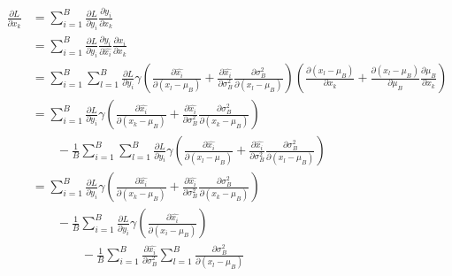 \documentclass[a4paper,11pt]{jsarticle}
\begin{document}
\begin{align*}
  \frac{\partial L}{\partial x_k} & = \sum_{i=1}^{B}\frac{\partial L}{\partial y_i}\frac{\partial y_i}{\partial x_k}                                                                                                                                                                                                                                                                          \\
                                  & = \sum_{i=1}^{B}\frac{\partial L}{\partial y_i}\frac{\partial y_i}{\partial \hat{x_i}}\frac{\partial \hat{x_i}}{\partial x_k}                                                                                                                                                                                                                             \\
                                  & = \sum_{i=1}^{B}\sum_{l=1}^{B}\frac{\partial L}{\partial y_i}\gamma(\frac{\partial \hat{x_i}}{\partial (x_l - \mu_B)} + \frac{\partial \hat{x_i}}{\partial \sigma_B^2}\frac{\partial \sigma_B^2}{\partial (x_l - \mu_B)})(\frac{\partial (x_l - \mu_B)}{\partial x_k} + \frac{\partial (x_l - \mu_B)}{\partial \mu_B}\frac{\partial \mu_B}{\partial x_k}) \\
                                  & = \sum_{i=1}^{B}\frac{\partial L}{\partial y_i}\gamma(\frac{\partial \hat{x_i}}{\partial (x_k - \mu_B)} +\frac{\partial \hat{x_i}}{\partial \sigma_B^2}\frac{\partial \sigma_B^2}{\partial (x_k - \mu_B)})                                                                                                                                                \\ & \qquad - \frac{1}{B}\sum_{i=1}^{B}\sum_{l=1}^{B}\frac{\partial L}{\partial y_i}\gamma(\frac{\partial \hat{x_i}}{\partial (x_l - \mu_B)} + \frac{\partial \hat{x_i}}{\partial \sigma_B^2}\frac{\partial \sigma_B^2}{\partial (x_l - \mu_B)})\\
                                  & = \sum_{i=1}^{B}\frac{\partial L}{\partial y_i}\gamma(\frac{\partial \hat{x_i}}{\partial (x_k - \mu_B)} +\frac{\partial \hat{x_i}}{\partial \sigma_B^2}\frac{\partial \sigma_B^2}{\partial (x_k - \mu_B)})                                                                                                                                                \\ & \qquad - \frac{1}{B}\sum_{i=1}^{B}\frac{\partial L}{\partial y_i}\gamma(\frac{\partial \hat{x_i}}{\partial (x_i - \mu_B)})  \\ &  \qquad\qquad - \frac{1}{B} \sum_{i=1}^{B}\frac{\partial \hat{x_i}}{\partial \sigma_B^2}\sum_{l=1}^{B}\frac{\partial \sigma_B^2}{\partial (x_l - \mu_B)} \\

\end{align*}
\end{document}
